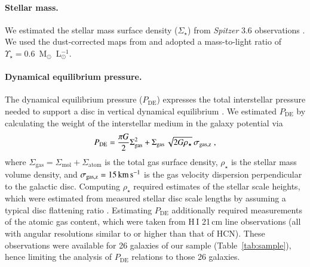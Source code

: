\documentclass[letter, longauth]{aa} %
\newcommand*{\hone}{\ensuremath{\text{H}\,{\scriptstyle\text{I}}}\xspace}  %
\newcommand*{\sigmol}{\ensuremath{\Sigma_{\text{mol}}}\xspace}  %
\newcommand*{\pde}{\ensuremath{P_{\text{DE}}}\xspace}  %
\newcommand*{\sigstar}{\ensuremath{\Sigma_{\star}}\xspace}  %
\newcommand*{\rhostar}{\ensuremath{\rho_{\star}}\xspace}  %
\newcommand*{\sigatom}{\ensuremath{\Sigma_{\text{atom}}}\xspace}  %
\newcommand*{\siggas}{\ensuremath{\Sigma_{\text{gas}}}\xspace}  %
\begin{document}
\paragraph{Stellar mass.}
We estimated the stellar mass surface density (\sigstar) from \textit{Spitzer} \SI{3.6}{\micron} observations \citep{Sheth2010,Querejeta2021b}. We used the dust-corrected maps from \citet{Querejeta2015} and adopted a mass-to-light ratio of $\Upsilon_\star = 0.6$~M$_\odot$~L$_\odot^{-1}$.

\paragraph{Dynamical equilibrium pressure.}
The dynamical equilibrium pressure (\pde) expresses the total interstellar pressure needed to support a disc in vertical dynamical equilibrium \citep[e.g. see][]{Ostriker2022, Schinnerer2024}. We estimated \pde by calculating the weight of the interstellar medium in the galaxy potential via\begin{align}
    \pde = \dfrac{\pi G}{2}\siggas^2 + \siggas \, \sqrt{2G\rhostar} \, \sigma_{\rm gas, z} \;,
\end{align}
where $\siggas=\sigmol + \sigatom$ is the total gas surface density, $\rhostar$ is the stellar mass volume density, and $\sigma_{\rm gas, z}=\SI{15}{\km\per\s}$ \citep[e.g.][]{Sun2018} is the gas velocity dispersion perpendicular to the galactic disc.
Computing \rhostar required estimates of the stellar scale heights, which were estimated from measured stellar disc scale lengths by assuming a typical disc flattening ratio \citep[see][for more details]{Sun2020b,Sun2022}.
Estimating \pde additionally required measurements of the atomic gas content, which were taken from \hone 21\,cm line observations (all with angular resolutions similar to or higher  than that of HCN). These observations were available for 26 galaxies of our sample (Table~\ref{tab:sample}), hence limiting the analysis of \pde relations to those 26 galaxies.
\end{document}
